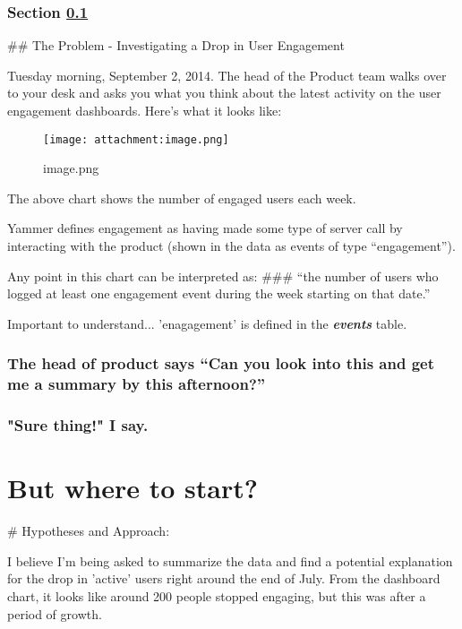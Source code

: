 \documentclass{report}
\makeatletter
\def\maxwidth{\ifdim\Gin@nat@width>\linewidth\linewidth
    \else\Gin@nat@width\fi}
\let\Oldincludegraphics\includegraphics
\renewcommand{\includegraphics}[1]{\Oldincludegraphics[width=.8\maxwidth]{#1}}
\makeatother
\begin{document}
\subsection{\texorpdfstring{Section \ref{appendix}}{}}\label{appendix}

 \#\# The Problem - Investigating a Drop in User Engagement

Tuesday morning, September 2, 2014. The head of the Product team walks
over to your desk and asks you what you think about the latest activity
on the user engagement dashboards. Here's what it looks like:

\begin{figure}
\centering
\texttt{[image: attachment:image.png]}
\caption{image.png}
\end{figure}

The above chart shows the number of engaged users each week.

Yammer defines engagement as having made some type of server call by
interacting with the product (shown in the data as events of type
``engagement'').

Any point in this chart can be interpreted as: \#\#\# ``the number of
users who logged at least one engagement event during the week starting
on that date.''

Important to understand... 'enagagement' is defined in the
\textbf{\emph{events}} table.

\subsection{The head of product says ``Can you look into this and get me
a summary by this
afternoon?''}\label{the-head-of-product-says-can-you-look-into-this-and-get-me-a-summary-by-this-afternoon}

\subsection{"Sure thing!" I say.}\label{sure-thing-i-say.}

\chapter{But where to start?}\label{but-where-to-start}

 \# Hypotheses and Approach:

I believe I'm being asked to summarize the data and find a potential
explanation for the drop in 'active' users right around the end of July.
From the dashboard chart, it looks like around 200 people stopped
engaging, but this was after a period of growth.
\end{document}
